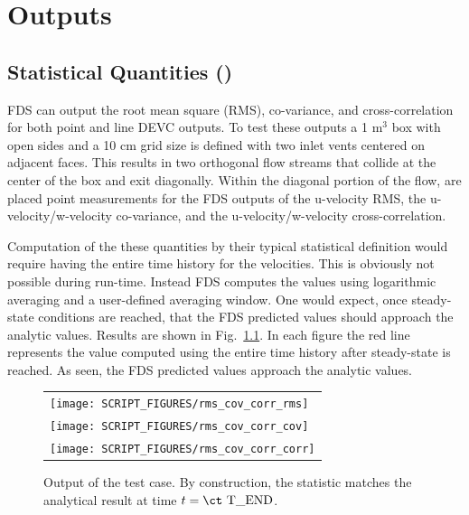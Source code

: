 \documentclass[11pt]{book}
\begin{document}
\chapter{Outputs}

\section{Statistical Quantities (\texorpdfstring{}{rms\_cov\_corr})}

FDS can output the root mean square (RMS), co-variance, and cross-correlation for both point and line {\ct DEVC} outputs.  To test these outputs a 1 m$^3$ box with open sides and a 10 cm grid size is defined with two inlet vents centered on adjacent faces.  This results in two orthogonal flow streams that collide at the center of the box and exit diagonally.  Within the diagonal portion of the flow, are placed point measurements for the FDS outputs of the u-velocity RMS, the u-velocity/w-velocity co-variance, and the u-velocity/w-velocity cross-correlation.

Computation of the these quantities by their typical statistical definition would require having the entire time history for the velocities.  This is obviously not possible during run-time.  Instead FDS computes the values using logarithmic averaging and a user-defined averaging window.  One would expect, once steady-state conditions are reached, that the FDS predicted values should approach the analytic values.  Results are shown in Fig.~\ref{rms_cov_corr_plots}.  In each figure the red line represents the value computed using the entire time history after steady-state is reached.  As seen, the FDS predicted values approach the analytic values.

\begin{figure}[h!]
\centering
\begin{tabular}{l}
\texttt{[image: SCRIPT\_FIGURES/rms\_cov\_corr\_rms]}\\
\texttt{[image: SCRIPT\_FIGURES/rms\_cov\_corr\_cov]} \\
\texttt{[image: SCRIPT\_FIGURES/rms\_cov\_corr\_corr]}
\end{tabular}
\caption[Sample case ]{Output of the  test case.  By construction, the statistic matches the analytical result at time $t = \mbox{\ct T\_END}$.}
\label{rms_cov_corr_plots}
\end{figure}

\clearpage
\end{document}
